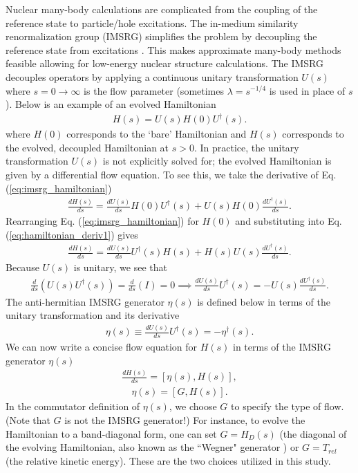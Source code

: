 \documentclass[preprintnumbers,floatfix,aps,prc,preprint]{revtex4-1}
\begin{document}
Nuclear many-body calculations are complicated from the coupling of the reference state to particle/hole excitations. The in-medium similarity renormalization group (IMSRG) simplifies the problem by decoupling the reference state from excitations \cite{Hergert:2017}. This makes approximate many-body methods feasible allowing for low-energy nuclear structure calculations. The IMSRG decouples operators by applying a continuous unitary transformation $U(s)$ where $s=0 \rightarrow \infty $ is the flow parameter (sometimes $\lambda=s^{-1/4}$ is used in place of $s$). Below is an example of an evolved Hamiltonian
%
\begin{eqnarray}
\label{eq:imsrg_hamiltonian}
H(s) = U(s) H(0) U^{\dagger}(s).
\end{eqnarray}
%
where $H(0)$ corresponds to the `bare' Hamiltonian and $H(s)$ corresponds to the evolved, decoupled Hamiltonian at $s>0$. In practice, the unitary transformation $U(s)$ is not explicitly solved for; the evolved Hamiltonian is given by a differential flow equation. To see this, we take the derivative of Eq. (\ref{eq:imsrg_hamiltonian})
%
\begin{eqnarray}
\label{eq:hamiltonian_deriv1}
\frac{dH(s)}{ds} = \frac{dU(s)}{ds} H(0) U^{\dagger}(s) + U(s) H(0) \frac{dU^{\dagger}(s)}{ds}.
\end{eqnarray}
%
Rearranging Eq. (\ref{eq:imsrg_hamiltonian}) for $H(0)$ and substituting into Eq. (\ref{eq:hamiltonian_deriv1}) gives
%
\begin{eqnarray}
\label{eq:hamiltonian_deriv2}
\frac{dH(s)}{ds} = \frac{dU(s)}{ds} U^{\dagger}(s) H(s) + H(s) U(s) \frac{dU^{\dagger}(s)}{ds}.
\end{eqnarray}
%
Because $U(s)$ is unitary, we see that
%
\begin{eqnarray}
\label{eq:antihermitian_u}
\frac{d}{ds}(U(s)U^{\dagger}(s)) = \frac{d}{ds}(I) = 0 \implies \frac{dU(s)}{ds} U^{\dagger}(s) = -U(s) \frac{dU^{\dagger}(s)}{ds}.
\end{eqnarray}
%
The anti-hermitian IMSRG generator $\eta(s)$ is defined below in terms of the unitary transformation and its derivative
%
\begin{eqnarray}
\label{eq:eta}
\eta(s) \equiv \frac{dU(s)}{ds} U^{\dagger}(s) = -\eta^{\dagger}(s).
\end{eqnarray}
%
We can now write a concise flow equation for $H(s)$ in terms of the IMSRG generator $\eta(s)$
%
\begin{eqnarray}
\label{eq:imsrg_flow}
\frac{dH(s)}{ds} = [\eta(s), H(s)],
\end{eqnarray}
%
\begin{eqnarray}
\label{eq:imsrg_generator}
\eta(s) = [G, H(s)].
\end{eqnarray}
%
In the commutator definition of $\eta(s)$, we choose $G$ to specify the type of flow. (Note that $G$ is not the IMSRG generator!) For instance, to evolve the Hamiltonian to a band-diagonal form, one can set $G=H_{D}(s)$ (the diagonal of the evolving Hamiltonian, also known as the ``Wegner" generator \cite{Wegner:1994}) or $G=T_{rel}$ (the relative kinetic energy). These are the two choices utilized in this study. \\
\end{document}
